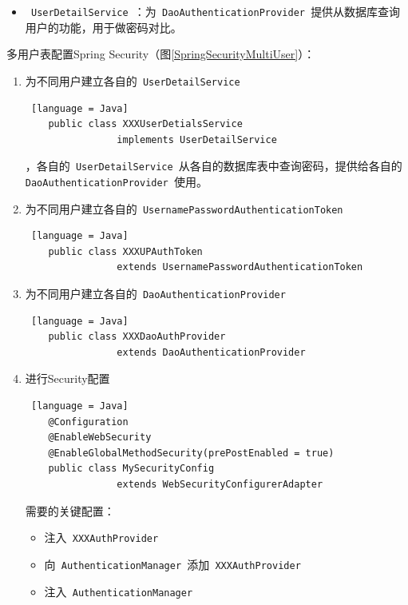 \begin{enumerate}
\begin{itemize}
          \item \lstinline[language = Java]| UserDetailService |：为\lstinline[language = Java]| DaoAuthenticationProvider |提供从数据库查询用户的功能，用于做密码对比。
        \end{itemize}
        多用户表配置Spring Security（图\ref{SpringSecurityMultiUser}）：
        \begin{enumerate}
          \item 为不同用户建立各自的\lstinline[language = Java]| UserDetailService |
                \begin{lstlisting} [language = Java]
    public class XXXUserDetialsService 
                implements UserDetailService
                \end{lstlisting}
                ，各自的\lstinline[language = Java]| UserDetailService |从各自的数据库表中查询密码，提供给各自的\lstinline[language = Java]| DaoAuthenticationProvider |使用。
          \item 为不同用户建立各自的\lstinline[language = Java]| UsernamePasswordAuthenticationToken | \begin{lstlisting} [language = Java]
    public class XXXUPAuthToken 
                extends UsernamePasswordAuthenticationToken
              \end{lstlisting}
          \item 为不同用户建立各自的\lstinline[language = Java]| DaoAuthenticationProvider | \begin{lstlisting} [language = Java]
    public class XXXDaoAuthProvider 
                extends DaoAuthenticationProvider
              \end{lstlisting}
          \item 进行Security配置 \begin{lstlisting} [language = Java]
    @Configuration
    @EnableWebSecurity
    @EnableGlobalMethodSecurity(prePostEnabled = true)
    public class MySecurityConfig 
                extends WebSecurityConfigurerAdapter 
              \end{lstlisting}
                需要的关键配置：
                \begin{itemize}
                  \item 注入\lstinline[language = Java]| XXXAuthProvider |
                  \item 向\lstinline[language = Java]| AuthenticationManager |添加\lstinline[language = Java]| XXXAuthProvider |
                  \item 注入\lstinline[language = Java]| AuthenticationManager |

\end{itemize}
\end{enumerate}
\end{enumerate}
